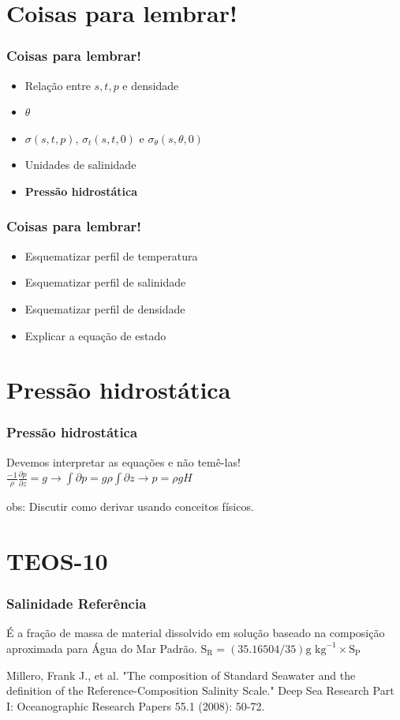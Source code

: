 \section{Coisas para lembrar!}
\begin{frame}
\frametitle{Coisas para lembrar!}
\begin{itemize}[<+-| alert@+>]
    \item Relação entre $s, t, p$ e densidade
    \item $\theta$
    \item $\sigma(s, t, p)$, $\sigma_t(s, t, 0)$ e
          $\sigma_{\theta}(s, \theta, 0)$
    \item Unidades de salinidade
    \item \bf{Pressão hidrostática}
\end{itemize}
\end{frame}

\begin{frame}
\frametitle{Coisas para lembrar!}
\begin{itemize}[<+-| alert@+>]
    \item Esquematizar perfil de temperatura
    \item Esquematizar perfil de salinidade
    \item Esquematizar perfil de densidade
    \item Explicar a equação de estado
\end{itemize}
\end{frame}

\section{Pressão hidrostática}
\begin{frame}
\frametitle{Pressão hidrostática}
    \begin{block}{Devemos interpretar as equações e não temê-las!}
    $\frac{-1}{\rho}\frac{\partial p}{\partial z} = g \rightarrow
    \int{\partial p} = g\rho \int{\partial z}
    \rightarrow p = \rho g H$
    \end{block}
    obs: Discutir como derivar usando conceitos físicos.
\end{frame}

\section{TEOS-10}
\begin{frame}
\frametitle{Salinidade Referência}
    \begin{block}{}
    É a fração de massa de material dissolvido em solução baseado
    na composição aproximada para Água do Mar Padrão.
    $\text{S}_\text{R} = (35.16504 / 35) \text{g kg}^{-1} \times \text{S}_\text{P}$
    \end{block}
\scriptsize{Millero, Frank J., et al. "The composition of Standard Seawater and the definition of the Reference-Composition Salinity Scale." Deep Sea Research Part I: Oceanographic Research Papers 55.1 (2008): 50-72.}
\end{frame}

